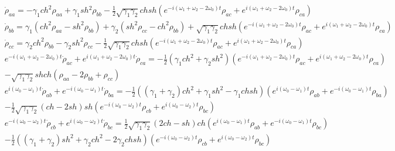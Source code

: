 \documentclass[aps,showpacs,twocolumn,twoside,groupedaddress]{revtex4}
\begin{document}
\begin{widetext}
\begin{subequations}
\begin{align}
&\dot{\rho}_{aa}=-\gamma_{1}ch^{2}\rho_{aa}+\gamma_{1}sh{}^{2}\rho_{bb}-\frac{1}{2}\sqrt{\gamma_{1}\gamma_{2}}chsh(e^{-i(\omega_{1}+\omega_{2}-2\omega_{0})t}\rho_{ac}+e^{i(\omega_{1}+\omega_{2}-2\omega_{0})t}\rho_{ca})\label{4a} \\
&\dot{\rho}_{bb}=\gamma_{1}(ch^{2}\rho_{aa}-sh^{2}\rho_{bb})+\gamma_{2}(sh^{2}\rho_{cc}-ch^{2}\rho_{bb})+\sqrt{\gamma_{1}\gamma_{2}}chsh(e^{-i(\omega_{1}+\omega_{2}-2\omega_{0})t}\rho_{ac}+e^{i(\omega_{1}+\omega_{2}-2\omega_{0})t}\rho_{ca})\label{4b}\\
&\dot{\rho}_{cc}=\gamma_{2}ch^{2}\rho_{bb}-\gamma_{2}sh^{2}\rho_{cc}-\frac{1}{2}\sqrt{\gamma_{1}\gamma_{2}}chsh(e^{-i(\omega_{1}+\omega_{2}-2\omega_{0})t}\rho_{ac}+e^{i(\omega_{1}+\omega_{2}-2\omega_{0})t}\rho_{ca})\label{4c}\\
&e^{-i(\omega_{1}+\omega_{2}-2\omega_{0})t}\dot{\rho}_{ac}+e^{i(\omega_{1}+\omega_{2}-2\omega_{0})t}\dot{\rho}_{ca}=-\frac{1}{2}(\gamma_{1}ch^{2}+\gamma_{2}sh^{2})(e^{-i(\omega_{1}+\omega_{2}-2\omega_{0})t}\rho_{ac}+e^{i(\omega_{1}+\omega_{2}-2\omega_{0})t}\rho_{ca})\nonumber\\
&-\sqrt{\gamma_{1}\gamma_{2}}shch(\rho_{aa}-2\rho_{bb}+\rho_{cc})\label{4d}\\
&e^{i(\omega_{0}-\omega_{1})t}\dot{\rho}_{ab}+e^{-i(\omega_{0}-\omega_{1})t}\dot{\rho}_{ba}=-\frac{1}{2}((\gamma_{1}+\gamma_{2})ch^{2}+\gamma_{1}sh^{2}-\gamma_{1}chsh)(e^{i(\omega_{0}-\omega_{1})t}\rho_{ab}+e^{-i(\omega_{0}-\omega_{1})t}\rho_{ba})\nonumber\\
&-\frac{1}{2}\sqrt{\gamma_{1}\gamma_{2}}(ch-2sh)sh(e^{-i(\omega_{0}-\omega_{2})t}\rho_{cb}+e^{i(\omega_{0}-\omega_{2})t}\rho_{bc})\label{4e}\\
&e^{-i(\omega_{0}-\omega_{2})t}\dot{\rho}_{cb}+e^{i(\omega_{0}-\omega_{2})t}\dot{\rho}_{bc}=\frac{1}{2}\sqrt{\gamma_{1}\gamma_{2}}(2ch-sh)ch(e^{i(\omega_{0}-\omega_{1})t}\rho_{ab}+e^{-i(\omega_{0}-\omega_{1})t}\rho_{bc})\nonumber\\
&-\frac{1}{2}((\gamma_{1}+\gamma_{2})sh^{2}+\gamma_{2}ch^{2}-2\gamma_{2}chsh)(e^{-i(\omega_{0}-\omega_{2})t}\rho_{cb}+e^{i(\omega_{0}-\omega_{2})t}\rho_{bc})\label{4f}
\end{align}
\end{subequations}
\end{widetext}
\end{document}

